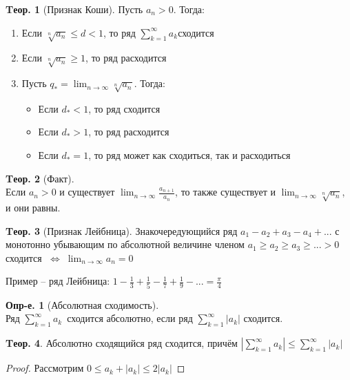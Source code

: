 \documentclass[a4paper,12pt]{article}
\numberwithin{figure}{section}
\theoremstyle{definition}
\newtheorem{definition}{Опр-е.}[section]
\theoremstyle{definition}
\newtheorem{theorem}{Tеор.}[section]
\def\ntoinf{n \to \infty}
\def\leqs{\leqslant}
\def\geqs{\geqslant}
\def\iff {$\;\Longleftrightarrow\;$}
\def\rowak{$\displaystyle\sum_{k=1}^{\infty}a_k$}
\begin{document}
\begin{theorem}[Признак Коши]
	Пусть $a_n>0$. Тогда:
	\begin{enumerate}
		\item Если $\displaystyle\sqrt[n]{a_n} \leqs d < 1$, то ряд \rowak сходится
		\item Если $\displaystyle\sqrt[n]{a_n} \geqs 1$, то ряд расходится
		\item Пусть $\displaystyle q_* = \lim_{\ntoinf} \sqrt[n]{a_n}$. Тогда:
		\begin{itemize}
			\item Если $d_* < 1$, то ряд сходится
			\item Если $d_* > 1$, то ряд расходится
			\item Если $d_* = 1$, то ряд может как сходиться, так и расходиться
		\end{itemize}
	\end{enumerate}
\end{theorem}

\begin{theorem}[Факт] \ \\
	Если $a_n>0$ и существует $\displaystyle \lim_{\ntoinf} \frac{a_{n+1}}{a_n}$,
	то также существует и $\displaystyle \lim_{\ntoinf} \sqrt[n]{a_n}$, и они равны.
\end{theorem}

\begin{theorem}[Признак Лейбница]
	Знакочередующийся ряд $a_1 - a_2 + a_3 - a_4 + ...$ с монотонно убывающим по абсолютной величине членом $a_1 \geqs a_2 \geqs a_3 \geqs ... > 0$
	сходится \iff $\displaystyle \lim_{\ntoinf} a_n = 0$
\end{theorem}

Пример -- ряд Лейбница: $\displaystyle 1-\frac13+\frac15-\frac17+\frac19-... = \frac\pi4$

\begin{definition}[Абсолютная сходимость] \ \\
	Ряд \rowak $\,$ сходится абсолютно, если ряд $\displaystyle\sum_{k=1}^{\infty}|a_k|$ сходится.
\end{definition}

\begin{theorem}
	Абсолютно сходящийся ряд сходится, причём
	$\displaystyle \left|\sum_{k=1}^{\infty}a_k\right| \leqs \sum_{k=1}^{\infty}|a_k|$
\end{theorem}
\begin{proof}
	Рассмотрим $0 \leqs a_k + |a_k| \leqs 2|a_k|$
\end{proof}
\end{document}
